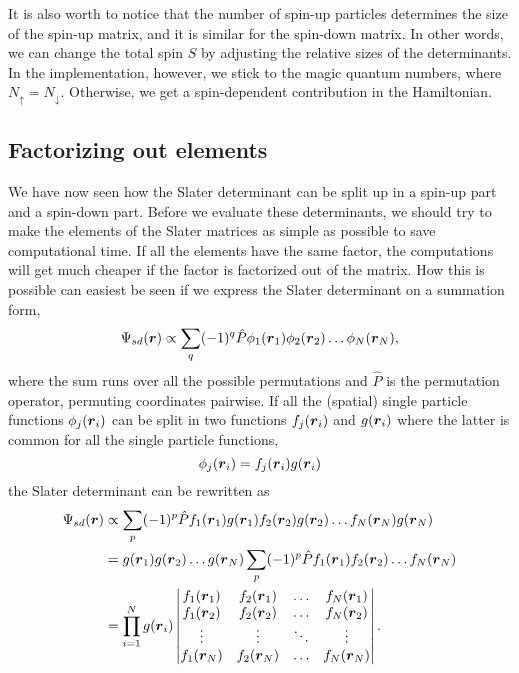 It is also worth to notice that the number of spin-up particles determines the size of the spin-up matrix, and it is similar for the spin-down matrix. In other words, we can change the total spin $S$ by adjusting the relative sizes of the determinants. In the implementation, however, we stick to the magic quantum numbers, where $N_{\uparrow}=N_{\downarrow}$. Otherwise, we get a spin-dependent contribution in the Hamiltonian.

\subsection{Factorizing out elements} \label{sec:factorizing}
We have now seen how the Slater determinant can be split up in a spin-up part and a spin-down part. Before we evaluate these determinants, we should try to make the elements of the Slater matrices as simple as possible to save computational time. If all the elements have the same factor, the computations will get much cheaper if the factor is factorized out of the matrix. How this is possible can easiest be seen if we express the Slater determinant on a summation form,
\begin{equation}
\Psi_{sd}(\boldsymbol{{r}})\propto\sum_{q}(-1)^q\hat{P}\phi_1(\boldsymbol{{r}}_1)\phi_2(\boldsymbol{{r}}_2)\hdots\phi_N(\boldsymbol{{r}}_N),
\label{eq:slatersum}
\end{equation}
where the sum runs over all the possible permutations and $\hat{P}$ is the permutation operator, permuting coordinates pairwise. If all the (spatial) single particle functions $\phi_j(\boldsymbol{{r}}_i)$ can be split in two functions $f_j(\boldsymbol{{r}}_i)$ and $g(\boldsymbol{{r}}_i)$ where the latter is common for all the single particle functions,
\begin{equation}
\phi_j(\boldsymbol{{r}}_i)=f_j(\boldsymbol{{r}}_i)g(\boldsymbol{{r}}_i)
\end{equation}
the Slater determinant can be rewritten as
\begin{equation}
\begin{aligned}
\Psi_{sd}(\boldsymbol{{r}})&\propto\sum_{p}(-1)^p\hat{P}f_1(\boldsymbol{{r}}_1)g(\boldsymbol{{r}}_1)f_2(\boldsymbol{{r}}_2)g(\boldsymbol{{r}}_2)\hdots f_N(\boldsymbol{{r}}_N)g(\boldsymbol{{r}}_N)\\
&=g(\boldsymbol{{r}}_1)g(\boldsymbol{{r}}_2)\hdots g(\boldsymbol{{r}}_N)\sum_{p}(-1)^p\hat{P}f_1(\boldsymbol{{r}}_1)f_2(\boldsymbol{{r}}_2)\hdots f_N(\boldsymbol{{r}}_N)\\
&=\prod_{i=1}^Ng(\boldsymbol{{r}}_i)
\begin{vmatrix}
f_1(\boldsymbol{r}_1) & f_2(\boldsymbol{r}_1) & \hdots & f_N(\boldsymbol{r}_1)\\
f_1(\boldsymbol{r}_2) & f_2(\boldsymbol{r}_2) & \hdots & f_N(\boldsymbol{r}_2)\\
\vdots & \vdots & \ddots & \vdots \\
f_1(\boldsymbol{r}_N) & f_2(\boldsymbol{r}_N) & \hdots & f_N(\boldsymbol{r}_N)
\end{vmatrix}.
\end{aligned}
\end{equation}
